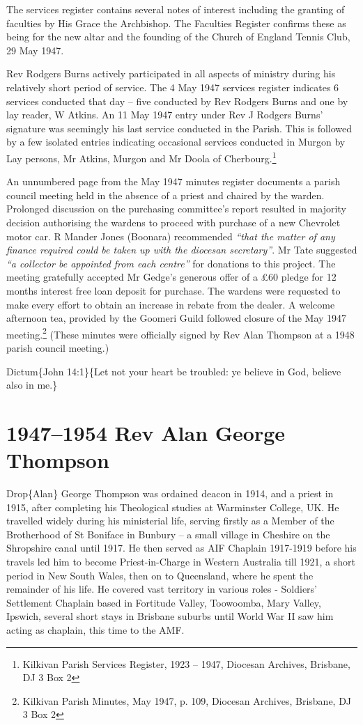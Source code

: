 The services register contains several notes of interest including the granting of faculties by His Grace the Archbishop. The Faculties Register confirms these as being for the new altar and the founding of the Church of England Tennis Club, 29 May 1947.

Rev Rodgers Burns actively participated in all aspects of ministry during his relatively short period of service. The 4 May 1947 services register indicates 6 services conducted that day -- five conducted by Rev Rodgers Burns and one by lay reader, W Atkins. An 11 May 1947 entry under Rev J Rodgers Burns' signature was seemingly his last service conducted in the Parish. This is followed by a few isolated entries indicating occasional services conducted in Murgon by Lay persons, Mr Atkins, Murgon and Mr Doola of Cherbourg.\footnote{Kilkivan Parish Services Register, 1923 -- 1947, Diocesan Archives, Brisbane, DJ 3 Box 2}

An unnumbered page from the May 1947 minutes register documents a parish council meeting held in the absence of a priest and chaired by the warden. Prolonged discussion on the purchasing committee's report resulted in majority decision authorising the wardens to proceed with purchase of a new Chevrolet motor car. R Mander Jones (Boonara) recommended \emph{``that the matter of any finance required could be taken up with the diocesan secretary''}. Mr Tate suggested \emph{``a collector be appointed from each centre''} for donations to this project. The meeting gratefully accepted Mr Gedge's generous offer of a £60 pledge for 12 months interest free loan deposit for purchase. The wardens were requested to make every effort to obtain an increase in rebate from the dealer. A welcome afternoon tea, provided by the Goomeri Guild followed closure of the May 1947 meeting.\footnote{Kilkivan Parish Minutes, May 1947, p. 109, Diocesan Archives, Brisbane, DJ 3 Box 2} (These minutes were officially signed by Rev Alan Thompson at a 1948 parish council meeting.)

Dictum\{John 14:1\}\{Let not your heart be troubled: ye believe in God, believe also in me.\}

\hypertarget{rev-alan-george-thompson}{%
\chapter{1947--1954 Rev Alan George Thompson}\label{rev-alan-george-thompson}}

Drop\{Alan\} George Thompson was ordained deacon in 1914, and a priest in 1915, after completing his Theological studies at Warminster College, UK. He travelled widely during his ministerial life, serving firstly as a Member of the Brotherhood of St Boniface in Bunbury -- a small village in Cheshire on the Shropshire canal until 1917. He then served as AIF Chaplain 1917-1919 before his travels led him to become Priest-in-Charge in Western Australia till 1921, a short period in New South Wales, then on to Queensland, where he spent the remainder of his life. He covered vast territory in various roles - Soldiers' Settlement Chaplain based in Fortitude Valley, Toowoomba, Mary Valley, Ipswich, several short stays in Brisbane suburbs until World War II saw him acting as chaplain, this time to the AMF.

